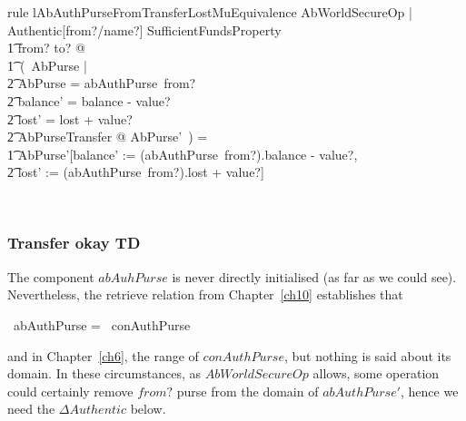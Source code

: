 \begin{LRRT}
\begin{theorem}{rule lAbAuthPurseFromTransferLostMuEquivalence}
    \forall  AbWorldSecureOp | Authentic[from?/name?] \land  SufficientFundsProperty \\
        \t1 \land from? \neq  to? @ \\
        \t1\ (~\mu  \Delta AbPurse | \\
            \t2 \theta AbPurse = abAuthPurse~from? \\
            \t2 \land balance' = balance - value? \\
            \t2 \land lost' = lost + value? \\
            \t2 \land \Xi AbPurseTransfer @ \theta AbPurse'~) = \\
        \t1 \theta AbPurse'[balance' := (abAuthPurse~from?).balance - value?, \\
            \t2 lost' := (abAuthPurse~from?).lost + value?]
\end{theorem}~\end{LRRT}


%
%

\subsubsection{Transfer okay TD}

The component $abAuhPurse$ is never directly initialised (as far as we could see).
Nevertheless, the retrieve relation from Chapter~\ref{ch10} establishes that
\begin{gzed}
 \dom~abAuthPurse = \dom~conAuthPurse
\end{gzed}
and in Chapter~\ref{ch6}, the range of $conAuthPurse$, but nothing is said about
its domain. In these circumstances, as $AbWorldSecureOp$ allows, some operation could
certainly remove $from?$ purse from the domain of $abAuthPurse'$, hence we need the
$\Delta Authentic$ below.

